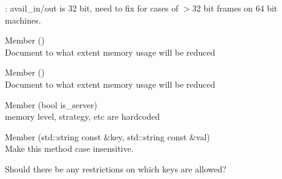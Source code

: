 \begin{DoxyRefList}
\+: avail\+\_\+in/out is 32 bit, need to fix for cases of \texorpdfstring{$>$}{>}32 bit frames on 64 bit machines. 
\item[Member \doxylink{classwebsocketpp_1_1extensions_1_1permessage__deflate_1_1enabled_a21e8e0200cab9dd276842ce9ecbd6639}{websocketpp\+::extensions\+::permessage\+\_\+deflate\+::enabled\texorpdfstring{$<$}{<} config \texorpdfstring{$>$}{>}\+::enable\+\_\+client\+\_\+no\+\_\+context\+\_\+takeover} ()]\hfill \\
\label{todo__todo000013}%
%
Document to what extent memory usage will be reduced 
\item[Member \doxylink{classwebsocketpp_1_1extensions_1_1permessage__deflate_1_1enabled_a9275c22cfd6782ef72a722168d663d8b}{websocketpp\+::extensions\+::permessage\+\_\+deflate\+::enabled\texorpdfstring{$<$}{<} config \texorpdfstring{$>$}{>}\+::enable\+\_\+server\+\_\+no\+\_\+context\+\_\+takeover} ()]\hfill \\
\label{todo__todo000012}%
%
Document to what extent memory usage will be reduced 
\item[Member \doxylink{classwebsocketpp_1_1extensions_1_1permessage__deflate_1_1enabled_a0d842cb0cd2add8016e739dfcd675ba0}{websocketpp\+::extensions\+::permessage\+\_\+deflate\+::enabled\texorpdfstring{$<$}{<} config \texorpdfstring{$>$}{>}\+::init} (bool is\+\_\+server)]\hfill \\
\label{todo__todo000011}%
%
memory level, strategy, etc are hardcoded 
\item[Member \doxylink{classwebsocketpp_1_1http_1_1parser_1_1parser_abd39762de5ec467a29a537d79602b603}{websocketpp\+::http\+::parser\+::parser\+::append\+\_\+header} (std\+::string const \&key, std\+::string const \&val)]\hfill \\
\label{todo__todo000017}%
%
Make this method case insensitive. 



Should there be any restrictions on which keys are allowed? 




\end{DoxyRefList}
